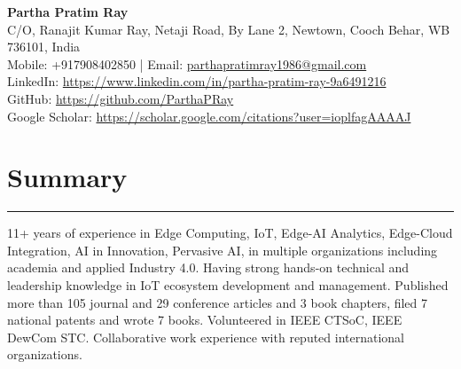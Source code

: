 \documentclass[10pt, a4paper]{article}
\begin{document}
	
	\begin{center}
		\textbf{\Large Partha Pratim Ray}\\
		\vspace{2mm}
		C/O, Ranajit Kumar Ray, Netaji Road, By Lane 2, Newtown, Cooch Behar, WB 736101, India \\
    Mobile: +917908402850 | Email: \href{mailto:parthapratimray1986@gmail.com}{parthapratimray1986@gmail.com}\\
		LinkedIn: \href{https://www.linkedin.com/in/partha-pratim-ray-9a6491216}{https://www.linkedin.com/in/partha-pratim-ray-9a6491216} \\
		GitHub: \href{https://github.com/ParthaPRay}{https://github.com/ParthaPRay} \\
		Google Scholar: \href{https://scholar.google.com/citations?user=ioplfagAAAAJ}{https://scholar.google.com/citations?user=ioplfagAAAAJ}\\
		\vspace{2mm}
	\end{center}
	
	\vspace*{-8mm}	
	
	\section*{Summary}
	\vspace*{-2.5mm}
	\hrule 
	\vspace*{2mm}
	11+ years of experience in Edge Computing, IoT, Edge-AI Analytics, Edge-Cloud Integration, AI in Innovation, Pervasive AI, in multiple organizations including academia and applied Industry 4.0. Having strong hands-on technical and leadership knowledge in IoT ecosystem development and management. Published more than 105 journal and 29 conference articles and 3 book chapters, filed 7 national patents and wrote 7 books. Volunteered in IEEE CTSoC, IEEE DewCom STC. Collaborative work experience with reputed international organizations. 
	
	\vspace*{-3mm}	
		
		
\end{document}

